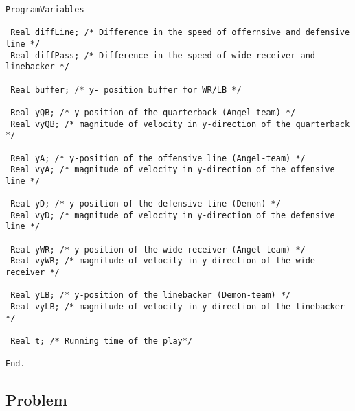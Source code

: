 \begin{lstlisting}
ProgramVariables

 Real diffLine; /* Difference in the speed of offernsive and defensive line */
 Real diffPass; /* Difference in the speed of wide receiver and linebacker */

 Real buffer; /* y- position buffer for WR/LB */

 Real yQB; /* y-position of the quarterback (Angel-team) */
 Real vyQB; /* magnitude of velocity in y-direction of the quarterback */

 Real yA; /* y-position of the offensive line (Angel-team) */
 Real vyA; /* magnitude of velocity in y-direction of the offensive line */

 Real yD; /* y-position of the defensive line (Demon) */
 Real vyD; /* magnitude of velocity in y-direction of the defensive line */

 Real yWR; /* y-position of the wide receiver (Angel-team) */
 Real vyWR; /* magnitude of velocity in y-direction of the wide receiver */

 Real yLB; /* y-position of the linebacker (Demon-team) */
 Real vyLB; /* magnitude of velocity in y-direction of the linebacker */

 Real t; /* Running time of the play*/

End.
\end{lstlisting}

\subsection{Problem}

\blindtext

